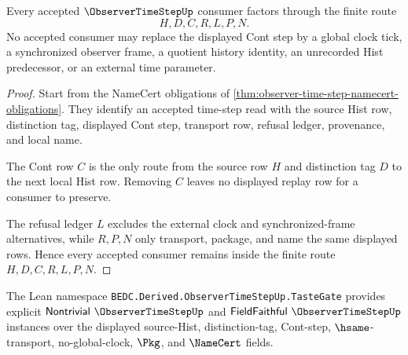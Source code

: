 \begin{theorem}
\label{thm:observer-time-step-nonescape}
Every accepted $\ObserverTimeStepUp$ consumer factors through the finite route
$$
H,D,C,R,L,P,N.
$$
No accepted consumer may replace the displayed Cont step by a global clock tick, a synchronized observer frame, a quotient history identity, an unrecorded Hist predecessor, or an external time parameter.
\end{theorem}
\begin{proof}
Start from the NameCert obligations of \autoref{thm:observer-time-step-namecert-obligations}. They identify an accepted time-step read with the source Hist row, distinction tag, displayed Cont step, transport row, refusal ledger, provenance, and local name.

The Cont row $C$ is the only route from the source row $H$ and distinction tag $D$ to the next local Hist row. Removing $C$ leaves no displayed replay row for a consumer to preserve.

The refusal ledger $L$ excludes the external clock and synchronized-frame alternatives, while $R,P,N$ only transport, package, and name the same displayed rows. Hence every accepted consumer remains inside the finite route $H,D,C,R,L,P,N$.
\end{proof}

The Lean namespace \texttt{BEDC.Derived.ObserverTimeStepUp.TasteGate} provides explicit $\mathsf{Nontrivial}\ \ObserverTimeStepUp$ and $\mathsf{FieldFaithful}\ \ObserverTimeStepUp$ instances over the displayed source-Hist, distinction-tag, Cont-step, $\hsame$-transport, no-global-clock, $\Pkg$, and $\NameCert$ fields.


\begin{closurestatus}{\ObserverTimeStepUp}
  \theoryclosure{\seedClosure}
  \formalstatus{\unformalizedV}
\end{closurestatus}
